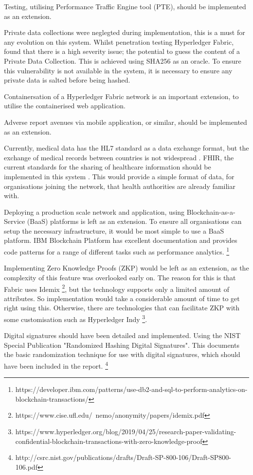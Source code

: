 Testing, utilising Performance Traffic Engine tool (PTE), should be implemented as an extension.

Private data collections were neglegted during implementation, this is a must for any evolution on this system.
Whilst penetration testing Hyperledger Fabric, \cite{shaw_penetration_2019} found that there is a high severity issue; the potential to guess the content of a Private Data Collection.
This is achieved using SHA256 as an oracle. To ensure this vulnerability is not available in the system, it is necessary to ensure any private data is salted before being hashed. 

Containersation of a Hyperledger Fabric network is an important extension, to utilise the containerised web application. 

Adverse report avenues via mobile application, or similar, should be implemented as an extension. 

Currently, medical data has the HL7 standard as a data exchange format, but the exchange of medical records between countries is not widespread \cite{kung_personal_2020}.
FHIR, the current standards for the sharing of healthcare information should be implemented in this system \cite{noauthor_overview_nodate}. 
This would provide a simple format of data, for organisations joining the network, that health authorities are already familiar with. 

Deploying a production scale network and application, using Blockchain-as-a-Service (BaaS) platforms is left as an extension. 
To ensure all organisations can setup the necessary infrastructure, it would be most simple to use a BaaS platform.
IBM Blockchain Platform has excellent documentation and provides code patterns for a range of different tasks such as performance analytics. \footnote{https://developer.ibm.com/patterns/use-db2-and-sql-to-perform-analytics-on-blockchain-transactions/}

Implementing Zero Knowledge Proofs (ZKP) would be left as an extension, as the complexity of this feature was overlooked early on. 
The reason for this is that Fabric uses Idemix \footnote{https://www.cise.ufl.edu/~nemo/anonymity/papers/idemix.pdf}, but the technology supports only a limited amount of attributes. 
So implementation would take a considerable amount of time to get right using this. 
Otherwise, there are technologies that can facilitate ZKP with some customisation such as Hyperledger Indy \footnote{https://www.hyperledger.org/blog/2019/04/25/research-paper-validating-confidential-blockchain-transactions-with-zero-knowledge-proof}.

Digital signatures should have been detailed and implemented. Using the NIST Special Publication "Randomized Hashing Digital Signatures". 
This documents the basic randomization technique for use with digital signatures, which should have been included in the report. \footnote{http://csrc.nist.gov/publications/drafts/Draft-SP-800-106/Draft-SP800-106.pdf} 